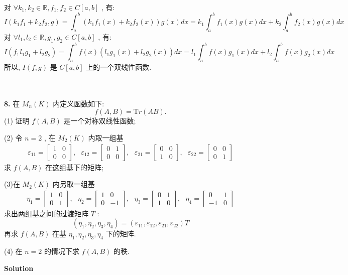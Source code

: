 \documentclass[11pt,a4paper,openany,oneside]{book}
\newcommand{\Tr}{\mathrm Tr}
\newcommand\Solution{\noindent\textbf{\textsf{Solution}}\par\medskip}
\begin{document}
对 $ \forall k_1, k_2 \in \mathbb{R}, f_1, f_2 \in C[a, b] $ , 有:
 $$  I(k_1f_1+k_2f_2, g) = \int_a^b (k_1f_1(x) + k_2f_2(x))g(x)dx = k_1\int_a^bf_1(x)g(x)dx + k_2\int_a^b f_2(x)g(x) dx  $$ 
对 $ \forall l_1, l_2 \in \mathbb{R}, g_1, g_2 \in C[a, b] $ , 有:
 $$  I(f, l_1g_1 + l_2g_2) = \int_a^b f(x)(l_1g_1(x) + l_2g_2(x))dx = l_1\int_a^b f(x)g_1(x)dx + l_2\int_a^b f(x)g_2(x) dx  $$ 
所以,  $ I(f, g) $ 是 $ C[a, b] $ 上的一个双线性函数. \\  \\  \\


\begin{myexample}
	\textbf{8.} 在 $ M_n(K) $ 内定义函数如下:
 $$  f(A,B) = \Tr(AB).  $$ 
(1) 证明 $ f(A,B) $ 是一个对称双线性函数; 

(2) 令 $ n=2 $ , 在 $ M_2(K) $ 内取一组基
\begin{gather*}
\varepsilon_{11} = 
\begin{bmatrix}
1  &  0  \\
0  &  0
\end{bmatrix}, \ \ \ 
\varepsilon_{12} =
\begin{bmatrix}
0  &  1  \\
0  &  0
\end{bmatrix}, \ \ \ 
\varepsilon_{21} =
\begin{bmatrix}
0  &  0  \\
1  &  0
\end{bmatrix}, \ \ \ 
\varepsilon_{22} = 
\begin{bmatrix}
0  &  0  \\
0  &  1
\end{bmatrix}
\end{gather*}
求 $ f(A,B) $ 在这组基下的矩阵; 

(3)在 $ M_2(K) $ 内另取一组基
\begin{gather*}
\eta_1 = 
\begin{bmatrix}
1  &  0  \\
0  &  1
\end{bmatrix}, \ \ \ 
\eta_2 =
\begin{bmatrix}
1  &  0  \\
0  &  -1
\end{bmatrix}, \ \ \ 
\eta_3 =
\begin{bmatrix}
0  &  1  \\
1  &  0
\end{bmatrix}, \ \ \ 
\eta_4 = 
\begin{bmatrix}
0  &  1  \\
-1  &  0
\end{bmatrix}
\end{gather*}
求出两组基之间的过渡矩阵 $ T $ :
 $$  (\eta_1, \eta_2, \eta_3, \eta_4) = (\varepsilon_{11}, \varepsilon_{12}, \varepsilon_{21}, \varepsilon_{22})T  $$ 
再求 $ f(A, B) $ 在基 $ \eta_1, \eta_2, \eta_3, \eta_4 $ 下的矩阵. 

(4) 在 $ n=2 $ 的情况下求 $ f(A,B) $ 的秩. 

\end{myexample}
\Solution 
\end{document}
